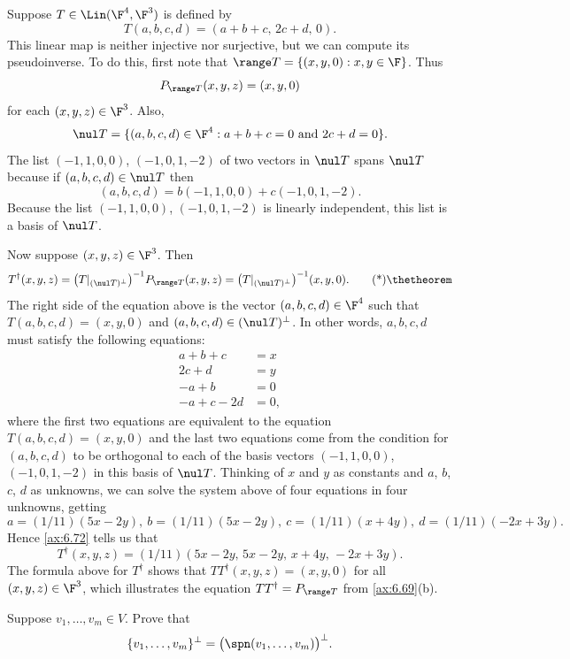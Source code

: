 \begin{example}\label{ax:6.71}
Suppose $T\in\Lin(\F^4,\F^3)$ is defined by
\[ T(a,b,c,d) = (a+b+c,\,2c+d,\,0). \]
This linear map is neither injective nor surjective, but we can compute its
pseudoinverse. To do this, first note that
$\range T=\{(x,y,0) : x,y\in\F\}$. Thus
\[ P_{\range T}(x,y,z) = (x,y,0) \]
for each $(x,y,z)\in\F^3$. Also,
\[ \nul T = \{(a,b,c,d)\in\F^4 : a+b+c=0 \text{ and } 2c+d=0\}. \]
The list $(-1,1,0,0)$, $(-1,0,1,-2)$ of two vectors in $\nul T$ spans $\nul T$
because if $(a,b,c,d)\in\nul T$ then
\[ (a,b,c,d) = b(-1,1,0,0)+c(-1,0,1,-2). \]
Because the list $(-1,1,0,0)$, $(-1,0,1,-2)$ is linearly independent, this list
is a basis of $\nul T$.

Now suppose $(x,y,z)\in\F^3$. Then
\begin{equation*}
T^\dagger(x,y,z) = \bigl(T|_{(\nul T)^\perp}\bigr)^{-1}P_{\range T}(x,y,z)
  = \bigl(T|_{(\nul T)^\perp}\bigr)^{-1}(x,y,0). \axeqtag
\end{equation*}
The right side of the equation above is the vector $(a,b,c,d)\in\F^4$ such that
$T(a,b,c,d)=(x,y,0)$ and $(a,b,c,d)\in(\nul T)^\perp$. In other words,
$a,b,c,d$ must satisfy the following equations:
\begin{align*}
a+b+c &= x\\
2c+d &= y\\
-a+b &= 0\\
-a+c-2d &= 0,
\end{align*}
where the first two equations are equivalent to the equation
$T(a,b,c,d)=(x,y,0)$ and the last two equations come from the condition for
$(a,b,c,d)$ to be orthogonal to each of the basis vectors $(-1,1,0,0)$,
$(-1,0,1,-2)$ in this basis of $\nul T$. Thinking of $x$ and $y$ as constants
and $a$, $b$, $c$, $d$ as unknowns, we can solve the system above of four
equations in four unknowns, getting
\[ a=(1/11)(5x-2y),\ b=(1/11)(5x-2y),\
   c=(1/11)(x+4y),\ d=(1/11)(-2x+3y). \]
Hence \ref{ax:6.72} tells us that
\[ T^\dagger(x,y,z) = (1/11)(5x-2y,\,5x-2y,\,x+4y,\,-2x+3y). \]
The formula above for $T^\dagger$ shows that $TT^\dagger(x,y,z)=(x,y,0)$ for
all $(x,y,z)\in\F^3$, which illustrates the equation $TT^\dagger=P_{\range T}$
from \ref{ax:6.69}(b).
\end{example}

\exercisesheading{6C}

\begin{exercise}
Suppose $v_1,\dots,v_m\in V$. Prove that
\[ \{v_1,\dots,v_m\}^\perp = \bigl(\spn(v_1,\dots,v_m)\bigr)^\perp. \]
\end{exercise}


